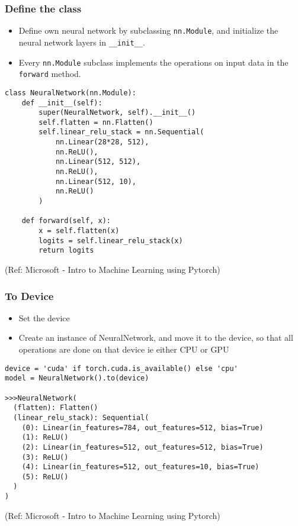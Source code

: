 \begin{frame}[fragile] \frametitle{Define the class}

\begin{itemize}
\item Define own neural network by subclassing \lstinline|nn.Module|, and initialize the neural network layers in \lstinline|__init__|. 
\item Every \lstinline|nn.Module| subclass implements the operations on input data in the \lstinline|forward| method.
\end{itemize}

\begin{lstlisting}
class NeuralNetwork(nn.Module):
    def __init__(self):
        super(NeuralNetwork, self).__init__()
        self.flatten = nn.Flatten()
        self.linear_relu_stack = nn.Sequential(
            nn.Linear(28*28, 512),
            nn.ReLU(),
            nn.Linear(512, 512),
            nn.ReLU(),
            nn.Linear(512, 10),
            nn.ReLU()
        )

    def forward(self, x):
        x = self.flatten(x)
        logits = self.linear_relu_stack(x)
        return logits
\end{lstlisting}

\tiny{(Ref: Microsoft - Intro to Machine Learning using Pytorch)}
\end{frame}

\begin{frame}[fragile] \frametitle{To Device}

\begin{itemize}
\item Set the device
\item Create an instance of NeuralNetwork, and move it to the device, so that all operations are done on that device ie either CPU or GPU
\end{itemize}

\begin{lstlisting}
device = 'cuda' if torch.cuda.is_available() else 'cpu'
model = NeuralNetwork().to(device)

>>>NeuralNetwork(
  (flatten): Flatten()
  (linear_relu_stack): Sequential(
    (0): Linear(in_features=784, out_features=512, bias=True)
    (1): ReLU()
    (2): Linear(in_features=512, out_features=512, bias=True)
    (3): ReLU()
    (4): Linear(in_features=512, out_features=10, bias=True)
    (5): ReLU()
  )
)
\end{lstlisting}

\tiny{(Ref: Microsoft - Intro to Machine Learning using Pytorch)}
\end{frame}


